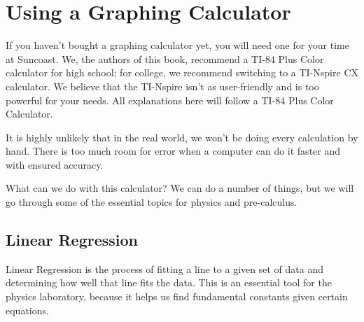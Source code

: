 \documentclass[../book.tex]{subfiles}
\begin{document}
\section{Using a Graphing Calculator}
\noindent If you haven't bought a graphing calculator yet, you will need one for your time at Suncoast.  We, the authors of this book, recommend a TI-84 Plus Color calculator for high school; for college, we recommend switching to a TI-Nspire CX calculator.  We believe that the TI-Nspire isn't as user-friendly and is too powerful for your needs.  All explanations here will follow a TI-84 Plus Color Calculator.

It is highly unlikely that in the real world, we won't be doing every calculation by hand.  There is too much room for error when a computer can do it faster and with ensured accuracy.

What can we do with this calculator?  We can do a number of things, but we will go through some of the essential topics for physics and pre-calculus.
\subsection{Linear Regression}
\noindent Linear Regression is the process of fitting a line to a given set of data and determining how well that line fits the data.  This is an essential tool for the physics laboratory, because it helps us find fundamental constants given certain equations.
\end{document}
